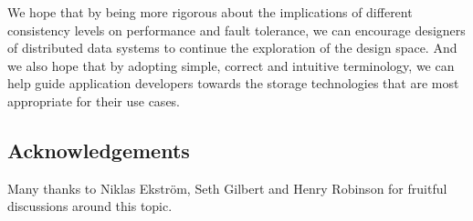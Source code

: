 \documentclass[a4paper,twocolumn,10pt]{article}
\begin{document}
We hope that by being more rigorous about the implications of different consistency levels on
performance and fault tolerance, we can encourage designers of distributed data systems to continue
the exploration of the design space. And we also hope that by adopting simple, correct and intuitive
terminology, we can help guide application developers towards the storage technologies that are most
appropriate for their use cases.

\subsection*{Acknowledgements}

Many thanks to Niklas Ekström, Seth Gilbert and Henry Robinson for fruitful discussions around this topic.

{\footnotesize

{}}
\end{document}
